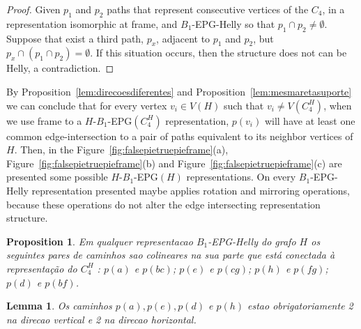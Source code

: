 \documentclass[a4paper,11pt]{article}
\newtheorem{lema}[theorem]{Lemma}
\newtheorem{prop}[theorem]{Proposition}
\begin{document}
\begin{proof}
Given $p_1$ and $p_2$ paths that represent consecutive vertices of the $C_4$, in a representation isomorphic at frame, and $B_1$-EPG-Helly so that $p_1 \cap p_2 \neq \emptyset$.
Suppose that exist a third path, $p_x$, adjacent to $p_1$ and $p_2$, but $p_x \cap (p_1 \cap p_2) = \emptyset$. If this situation occurs, then the structure does not can be  Helly, a contradiction.
\end{proof}


By Proposition~\ref{lem:direcoesdiferentes} and Proposition~\ref{lem:mesmaretasuporte} we can conclude that for every vertex $v_i \in V(H)$ such that $v_i \neq V(C_4^H)$, when we use frame to a $H$-$B_{1}$-EPG$(C_4^H)$ representation, $p(v_i)$ will have at least one common edge-intersection to a pair of paths equivalent to its neighbor vertices of $H$. Then, in the Figure~\ref{fig:falsepietruepieframe}(a), Figure~\ref{fig:falsepietruepieframe}(b) and Figure~\ref{fig:falsepietruepieframe}(c) are presented some possible $H$-$B_{1}$-EPG$(H)$ representations. On every $ B_1$-EPG-Helly representation presented maybe applies rotation and mirroring operations, because these operations do not alter the edge intersecting representation structure.


\begin{prop}
Em qualquer representacao $B_1$-EPG-Helly do grafo $H$ os seguintes pares de caminhos sao colineares na sua parte que está conectada à representação do $C_4^H$ : $p(a)$ e $p(bc)$; $p(e)$ e $p(cg)$; $p(h)$ e $p(fg)$; $p(d)$ e $p(bf)$.
\end{prop}

\begin{lema}
Os caminhos $p(a), p(e), p(d)$ e $p(h)$ estao obrigatoriamente 2 na direcao vertical e 2 na direcao horizontal.
\end{lema}



%



\end{document}

